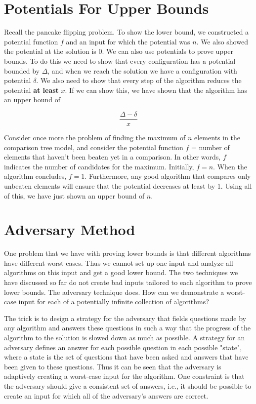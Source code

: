 
\section{Potentials For Upper Bounds}

Recall the pancake flipping problem. To show the lower bound, we
constructed a potential function $f$ and an input for which
the potential was $n$. We also showed the potential at the
solution is 0. We can also use potentials to prove upper bounds. To do
this we need to show that every configuration has a potential bounded
by $\Delta$, and when we reach the solution we have a configuration
with potential $\delta$. We also need to show that every step of the
algorithm reduces the potential \textbf{at least} $x$. If we can show
this, we have shown that the algorithm has an upper bound of

$$
\frac{\Delta - \delta}{x}
$$

Consider once more the problem of finding the maximum of $n$ elements
in the comparison tree model, and consider the potential function 
$f$ = number of elements that haven't been beaten yet in a comparison.
In other words, $f$ indicates the number of candidates for the
maximum. Initially, $f = n$. When the algorithm concludes,
$f = 1$. Furthermore, any good algorithm that compares only
unbeaten elements will ensure that the potential decreases at least
by 1. Using all of this, we have just shown an upper bound of $n$.


\section{Adversary Method}

One problem that we have with proving lower bounds is that different
algorithms have different worst-cases. Thus we cannot set up one input
and analyze all algorithms on this input and get a good lower bound.
The two techniques we have discussed so far do not create bad inputs
tailored to each algorithm to prove lower bounds. The adversary 
technique does. How can we demonstrate a worst-case input for each of 
a potentially infinite collection of algorithms?

The trick is to design a strategy for the adversary that fields
questions made by any algorithm and answers these questions in such a
way that the progress of the algorithm to the solution is slowed down
as much as possible. A strategy for an adversary defines an answer for
each possible question in each possible "state", where a state is the set of questions that have been asked and answers that have been given to these questions. Thus it can be seen that the adversary is adaptively creating a worst-case input for the algorithm. One constraint is that the adversary should give a consistent set of answers, i.e., it should be possible to create an input for which all of the adversary’s answers are correct.

